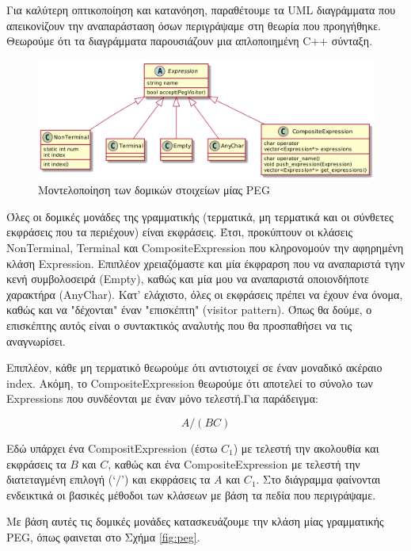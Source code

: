 \documentclass[diploma]{softlab-thesis}
\begin{document}
Για καλύτερη οπτικοποίηση και κατανόηση, παραθέτουμε τα UML διαγράμματα που απεικονίζουν την αναπαράσταση όσων περιγράψαμε στη θεωρία που προηγήθηκε. Θεωρούμε ότι τα διαγράμματα παρουσιάζουν μια απλοποιημένη C++ σύνταξη.

\begin{figure}[h]
    \centering
	\includegraphics[width=1.10\textwidth]{uml/peg_elements}
	\caption{Μοντελοποίηση των δομικών στοιχείων μίας PEG}
    \label{fig:peg_elements}
\end{figure}

Όλες οι δομικές μονάδες της γραμματικής (τερματικά, μη τερματικά και οι σύνθετες εκφράσεις που τα περιέχουν) είναι εκφράσεις. 
Έτσι, προκύπτουν οι κλάσεις NonTerminal, Terminal και CompositeExpression που κληρονομούν την αφηρημένη κλάση Expression.
Επιπλέον χρειαζόμαστε και μία έκφραρση που να αναπαριστά τγην κενή συμβολοσειρά (Empty), καθώς και μία μου να αναπαριστά οποιονδήποτε χαρακτήρα (AnyChar).
Κατ' ελάχιστο, όλες οι εκφράσεις πρέπει να έχουν ένα όνομα, καθώς και να "δέχονται" έναν "επισκέπτη" (visitor pattern).
Όπως θα δούμε, ο επισκέπτης αυτός είναι ο συντακτικός αναλυτής που θα προσπαθήσει να τις αναγνωρίσει.

Επιπλέον, κάθε μη τερματικό θεωρούμε ότι αντιστοιχεί σε έναν μοναδικό ακέραιο index. 
Ακόμη, το CompositeExpression θεωρούμε ότι αποτελεί το σύνολο των Expressions που συνδέονται με έναν μόνο τελεστή.Για παράδειγμα:

\begin{equation}
	A / (B C)
\end{equation}

Εδώ υπάρχει ένα CompositExpression (έστω $C_1$) με τελεστή την ακολουθία και εκφράσεις τα $B$ και $C$, καθώς και ένα CompositeExpression με τελεστή την διατεταγμένη επιλογή (`$/$') και εκφράσεις τα $A$ και $C_1$. 
Στο διάγραμμα φαίνονται ενδεικτικά οι βασικές μέθοδοι των κλάσεων με βάση τα πεδία που περιγράψαμε.

Με βάση αυτές τις δομικές μονάδες κατασκευάζουμε την κλάση μίας γραμματικής PEG, όπως φαινεται στο Σχήμα \ref{fig:peg}.
\end{document}
